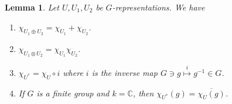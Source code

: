 \documentclass[10pt]{article}
\newtheorem{lemma}{Lemma}[section]
\numberwithin{equation}{theorem}
\newcommand{\C}[0]{\mathbb{C}}
\begin{document}
\begin{lemma}
  Let $U,U_1,U_2$ be $G$-representations. We have 
  \begin{enumerate}[1.]
    \item $\chi_{U_1\oplus U_2} = \chi_{U_1}+\chi_{U_2}$.
    \item $\chi_{U_1\otimes U_2} = \chi_{U_1}\chi_{U_2}$.
    \item $\chi_{U^*} = \chi_U\circ i$ where $i$ is the inverse map $G\ni g\stackrel{i}{\mapsto}g^{-1}\in G$.
    \item If $G$ is a finite group and $k=\C$, then $\chi_{U^*}(g) = \overline{\chi_U(g)}$.
  \end{enumerate}
\end{lemma}
\end{document}
